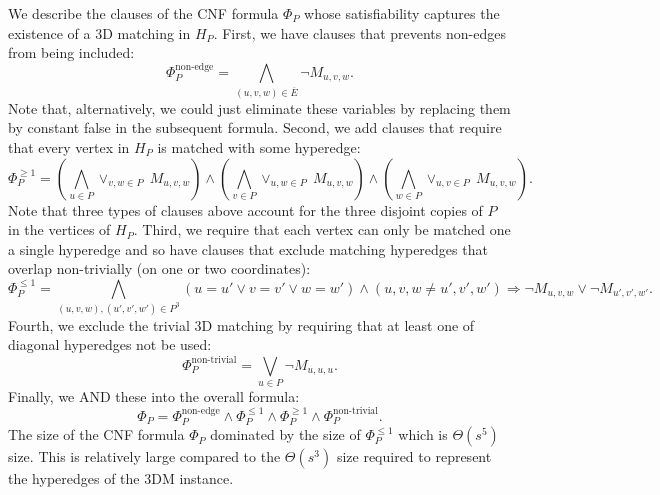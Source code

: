 \documentclass[11pt]{article}
\begin{document}
We describe the clauses of the CNF formula $\Phi_P$ whose
satisfiability captures the existence of a 3D matching in $H_P$.
First, we have clauses that prevents non-edges from being included:
\begin{equation}
  \Phi_P^{\text{non-edge}} = \bigwedge_{(u,v,w) \in \overline{E}} \neg M_{u,v,w}.
\end{equation}
Note that, alternatively, we could just eliminate these variables by
replacing them by constant false in the subsequent formula. Second, we
add clauses that require that every vertex in $H_P$ is matched with some
hyperedge:
\begin{equation}
  \Phi_P^{\ge 1} = 
  \left(\bigwedge_{u \in P}\vee_{v,w \in P} ~M_{u,v,w}\right)
  \wedge \left(\bigwedge_{v \in P}\vee_{u,w \in P} ~M_{u,v,w}\right)
  \wedge \left(\bigwedge_{w \in P}\vee_{u,v \in P} ~M_{u,v,w}\right).
\end{equation}
Note that three types of clauses above account for the three disjoint
copies of $P$ in the vertices of $H_P$.  Third, we require that each
vertex can only be matched one a single hyperedge and so have clauses
that exclude matching hyperedges that overlap non-trivially (on one or two
coordinates):
\begin{equation}
  \Phi_P^{\le 1} =
    \bigwedge_{(u,v,w), (u',v',w') \in P^3} (u = u' \vee v = v' \vee w = w') \wedge  (u,v,w \neq u',v',w') \Rightarrow \neg M_{u,v,w} \vee \neg M_{u',v',w'}.
\end{equation}
Fourth, we exclude the trivial 3D matching by requiring that at least
one of diagonal hyperedges not be used:
\begin{equation}
  \Phi_P^{\text{non-trivial}} = \bigvee_{u \in P} \neg M_{u,u,u}.
\end{equation}
Finally, we AND these into the overall formula:
\begin{equation}
  \Phi_P = \Phi_P^{\text{non-edge}} \wedge \Phi_P^{\le 1} \wedge \Phi_P^{\ge 1} \wedge \Phi_P^{\text{non-trivial}}.
\end{equation}
The size of the CNF formula $\Phi_P$ dominated by the size of
$\Phi_P^{\le 1}$ which is $\Theta(s^5)$ size.  This is relatively
large compared to the $\Theta(s^3)$ size required to represent the
hyperedges of the 3DM instance.
\end{document}
